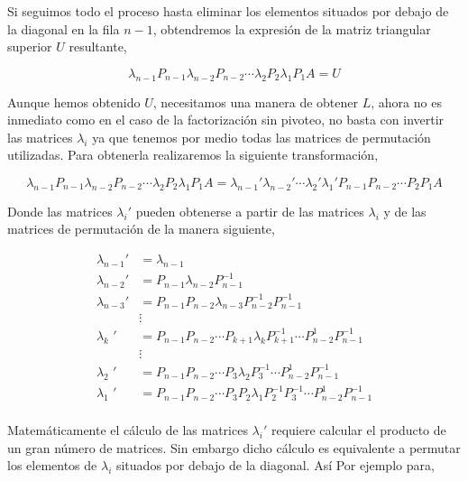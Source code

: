 Si seguimos todo el proceso hasta eliminar los elementos situados por debajo de la diagonal en la fila $n-1$, obtendremos la expresión de la matriz triangular superior $U$ resultante,

\begin{equation*}
\lambda_{n-1}P_{n-1}\lambda_{n-2}P_{n-2} \cdots  \lambda_2  P_2 \lambda_1  P_1 A = U
\end{equation*}

Aunque hemos obtenido $U$, necesitamos una manera de obtener $L$, ahora no es inmediato como en el caso de la factorización sin pivoteo, no basta con invertir las matrices $\lambda_i$ ya que tenemos por medio todas las matrices de permutación utilizadas. Para obtenerla realizaremos la siguiente transformación, 

\begin{equation*}
\lambda_{n-1}P_{n-1}\lambda_{n-2}P_{n-2} \cdots  \lambda_2  P_2 \lambda_1  P_1 A = \lambda_{n-1}'\lambda_{n-2}'\cdots \lambda_2'   \lambda_1' P_{n-1}P_{n-2} \cdots P_2  P_1 A
\end{equation*}

Donde las matrices $\lambda_i'$ pueden obtenerse a partir de las matrices $\lambda_i$ y de las matrices de permutación de la manera siguiente,

\begin{align*}
\lambda_{n-1}' &= \lambda_{n-1} \\
\lambda_{n-2}' &= P_{n-1}\lambda_{n-2} P_{n-1} ^{-1}\\
\lambda_{n-3}' &= P_{n-1}P_{n-2}\lambda_{n-3}P_{n-2}^{-1} P_{n-1}^{-1} \\
 & \vdots \\
 \lambda_{k\ \ }'  &= P_{n-1}P_{n-2}\cdots P_{k+1} \lambda_{k}P_{k+1}^{-1} \cdots P_{n-2}^{1} P_{n-1}^{-1} \\
 & \vdots \\
\lambda_{2\ \ }'  &= P_{n-1}P_{n-2}\cdots P_3 \lambda_{2}P_3^{-1} \cdots P_{n-2}^{1} P_{n-1}^{-1} \\
\lambda_{1\ \ }'  &= P_{n-1}P_{n-2}\cdots P_3P_2 \lambda_{1}P_2^{-1}P_3^{-1} \cdots P_{n-2}^{1} P_{n-1}^{-1} \\
\end{align*}


Matemáticamente el cálculo de las matrices $\lambda_i'$ requiere calcular el producto de un gran número de matrices.  Sin embargo dicho cálculo es equivalente a permutar los elementos de $\lambda_i$ situados por debajo de la diagonal.   Así Por ejemplo para,

